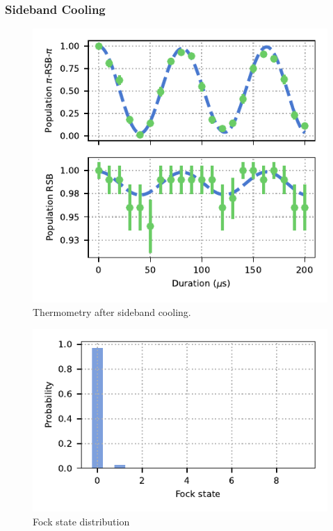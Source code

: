 \documentclass[12pt]{report}
\begin{document}
    \subsubsection{Sideband Cooling}

    \begin{figure}
        \begin{center}
        \noindent\includegraphics[width=\linewidth]{
            figures/pdf_figure/sideband_thermometry.pdf
            }
        \end{center}
        \caption{
            Thermometry after sideband cooling.
            }
        \label{fig:SBC}
    \end{figure}

    \begin{figure}
        \begin{center}
        \noindent\includegraphics[width=\linewidth]{
            figures/pdf_figure/fock_state_distribution.pdf
            }
        \end{center}
        \caption{
            Fock state distribution
            }
        \label{fig:fock state}
    \end{figure}
\end{document}
